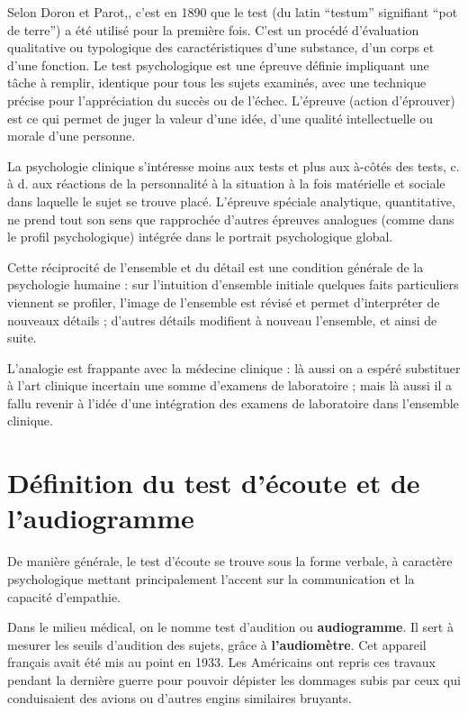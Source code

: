 Selon Doron et Parot,\autocite {doronparot}, c'est en 1890 que le test (du latin ``testum''
signifiant ``pot de terre'') a été utilisé pour la
première fois. C'est un procédé d'évaluation qualitative ou
typologique des caractéristiques d'une substance, d'un corps et d'une
fonction.
Le test psychologique est une épreuve définie impliquant une tâche à
remplir, identique pour tous les sujets examinés, avec une technique
précise pour l'appréciation du succès ou de l'échec.
L'épreuve (action d'éprouver) est ce qui permet de juger la valeur
d'une idée, d'une qualité intellectuelle ou morale d'une personne.

La psychologie clinique s’intéresse moins
aux tests et plus aux à-côtés des tests, c. à d. aux réactions de la
personnalité à la situation à la fois matérielle et sociale dans
laquelle le sujet se trouve placé. L’épreuve spéciale analytique,
quantitative, ne prend tout son sens que rapprochée d’autres épreuves
analogues (comme dans le profil psychologique) intégrée dans le
portrait psychologique global.

Cette réciprocité de l’ensemble et du détail est une condition générale de la psychologie humaine : sur l’intuition d’ensemble initiale quelques faits particuliers viennent se profiler, l’image de l’ensemble est révisé et permet d’interpréter de nouveaux détails ; d’autres détails modifient à nouveau l’ensemble, et ainsi de suite.


L’analogie est frappante avec la médecine clinique : là aussi on a
espéré substituer à l’art clinique incertain une somme d’examens de
laboratoire ; mais là aussi il a fallu revenir à l’idée d’une
intégration des examens de laboratoire dans l’ensemble clinique.



\section{Définition du test d'écoute et de l'audiogramme}

De manière générale, le test d'écoute se trouve sous la forme verbale,
à caractère
psychologique mettant principalement l'accent sur la communication
et la capacité d'empathie.

Dans le milieu médical, on le nomme test d'audition ou \textbf{audiogramme}. Il
sert à mesurer les seuils d'audition des sujets, grâce à\textbf{ l'audiomètre}. Cet
appareil français avait été mis au point en 1933. Les Américains
ont repris ces travaux pendant la dernière guerre pour pouvoir dépister
les dommages subis par ceux qui conduisaient des avions ou d'autres
engins similaires bruyants.




